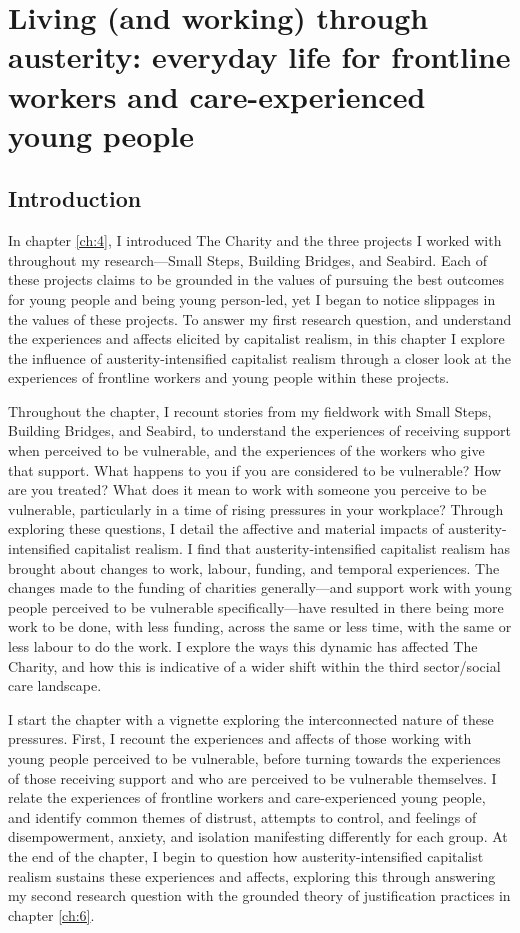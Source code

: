 \chapter{Living (and working) through austerity: everyday life for frontline workers and care-experienced young people}
\label{ch:5}

\section{Introduction}
\label{sec:5-intro}

In chapter \ref{ch:4}, I introduced The Charity and the three projects I worked with throughout my research—Small Steps, Building Bridges, and Seabird. Each of these projects claims to be grounded in the values of pursuing the best outcomes for young people and being young person-led, yet I began to notice slippages in the values of these projects. To answer my first research question, and understand the experiences and affects elicited by capitalist realism, in this chapter I explore the influence of austerity-intensified capitalist realism through a closer look at the experiences of frontline workers and young people within these projects.

Throughout the chapter, I recount stories from my fieldwork with Small Steps, Building Bridges, and Seabird, to understand the experiences of receiving support when perceived to be vulnerable, and the experiences of the workers who give that support. What happens to you if you are considered to be vulnerable? How are you treated? What does it mean to work with someone you perceive to be vulnerable, particularly in a time of rising pressures in your workplace? Through exploring these questions, I detail the affective and material impacts of austerity-intensified capitalist realism. I find that austerity-intensified capitalist realism has brought about changes to work, labour, funding, and temporal experiences. The changes made to the funding of charities generally—and support work with young people perceived to be vulnerable specifically—have resulted in there being more work to be done, with less funding, across the same or less time, with the same or less labour to do the work. I explore the ways this dynamic has affected The Charity, and how this is indicative of a wider shift within the third sector/social care landscape. 

I start the chapter with a vignette exploring the interconnected nature of these pressures. First, I recount the experiences and affects of those working with young people perceived to be vulnerable, before turning towards the experiences of those receiving support and who are perceived to be vulnerable themselves. I relate the experiences of frontline workers and care-experienced young people, and identify common themes of distrust, attempts to control, and feelings of disempowerment, anxiety, and isolation manifesting differently for each group. At the end of the chapter, I begin to question how austerity-intensified capitalist realism sustains these experiences and affects, exploring this through answering my second research question with the grounded theory of justification practices  in chapter \ref{ch:6}. 

